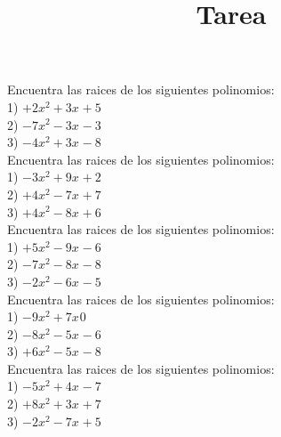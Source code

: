 \documentclass[a4paper,12pt]{article}
\title{Tarea}
\author{}
\date{}
\begin{document}
\maketitle
Encuentra las raices de los siguientes polinomios: \vspace{1cm}\\ 
1) $ +2x^{2}+3x^{}+5$ \vspace{3cm}\\ 
2) $ -7x^{2}-3x^{}-3$ \vspace{3cm}\\ 
3) $ -4x^{2}+3x^{}-8$ \vspace{3cm}\\ 

 \pagebreak 
Encuentra las raices de los siguientes polinomios: \vspace{1cm}\\ 
1) $ -3x^{2}+9x^{}+2$ \vspace{3cm}\\ 
2) $ +4x^{2}-7x^{}+7$ \vspace{3cm}\\ 
3) $ +4x^{2}-8x^{}+6$ \vspace{3cm}\\ 

 \pagebreak 
Encuentra las raices de los siguientes polinomios: \vspace{1cm}\\ 
1) $ +5x^{2}-9x^{}-6$ \vspace{3cm}\\ 
2) $ -7x^{2}-8x^{}-8$ \vspace{3cm}\\ 
3) $ -2x^{2}-6x^{}-5$ \vspace{3cm}\\ 

 \pagebreak 
Encuentra las raices de los siguientes polinomios: \vspace{1cm}\\ 
1) $ -9x^{2}+7x^{}0$ \vspace{3cm}\\ 
2) $ -8x^{2}-5x^{}-6$ \vspace{3cm}\\ 
3) $ +6x^{2}-5x^{}-8$ \vspace{3cm}\\ 

 \pagebreak 
Encuentra las raices de los siguientes polinomios: \vspace{1cm}\\ 
1) $ -5x^{2}+4x^{}-7$ \vspace{3cm}\\ 
2) $ +8x^{2}+3x^{}+7$ \vspace{3cm}\\ 
3) $ -2x^{2}-7x^{}+5$ \vspace{3cm}\\ 
\end{document}
